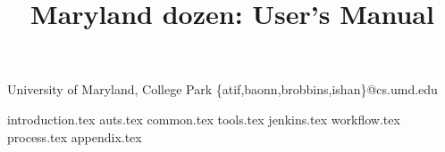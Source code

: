 \documentclass[nocopyrightspace]{sigplanconf}
\begin{document}


\title{Maryland dozen: User's Manual}

 {University of Maryland, College Park}
 {\{atif,baonn,brobbins,ishan\}@cs.umd.edu}

\maketitle



\newcommand{\mddozen}{Maryland dozen}

\tableofcontents
 {introduction.tex}
 {auts.tex}
 {common.tex}
 {tools.tex}
 {jenkins.tex}
 {workflow.tex}
 {process.tex}
 {appendix.tex}
\end{document}
